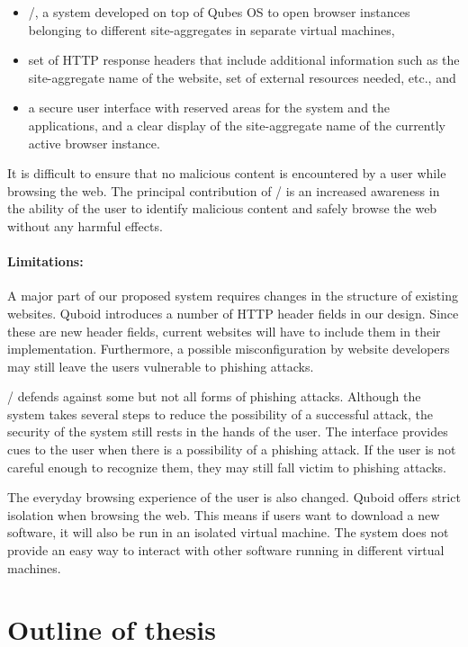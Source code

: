 \begin{itemize}
    \item \namesecureworkstation/, a system developed on top of Qubes OS to open browser instances belonging to different site-aggregates in separate virtual machines,
    \item set of HTTP response headers that include additional information such as the site-aggregate name of the website, set of external resources needed, etc., and
    \item a secure user interface with reserved areas for the system and the applications, and a clear display of the site-aggregate name of the currently active browser instance.
\end{itemize}

It is difficult to ensure that no malicious content is encountered by a user while browsing the web. The principal contribution of \namesecureworkstation/ is an increased awareness in the ability of the user to identify malicious content and safely browse the web without any harmful effects.

\paragraph{Limitations:} A major part of our proposed system requires changes in the structure of existing websites. Quboid introduces a number of HTTP header fields in our design. Since these are new header fields, current websites will have to include them in their implementation. Furthermore, a possible misconfiguration by website developers may still leave the users vulnerable to phishing attacks.

\namesecureworkstation/ defends against some but not all forms of phishing attacks. Although the system takes several steps to reduce the possibility of a successful attack, the security of the system still rests in the hands of the user. The interface provides cues to the user when there is a possibility of a phishing attack. If the user is not careful enough to recognize them, they may still fall victim to phishing attacks.

The everyday browsing experience of the user is also changed. Quboid offers strict isolation when browsing the web. This means if users want to download a new software, it will also be run in an isolated virtual machine. The system does not provide an easy way to interact with other software running in different virtual machines.

\section{Outline of thesis}

